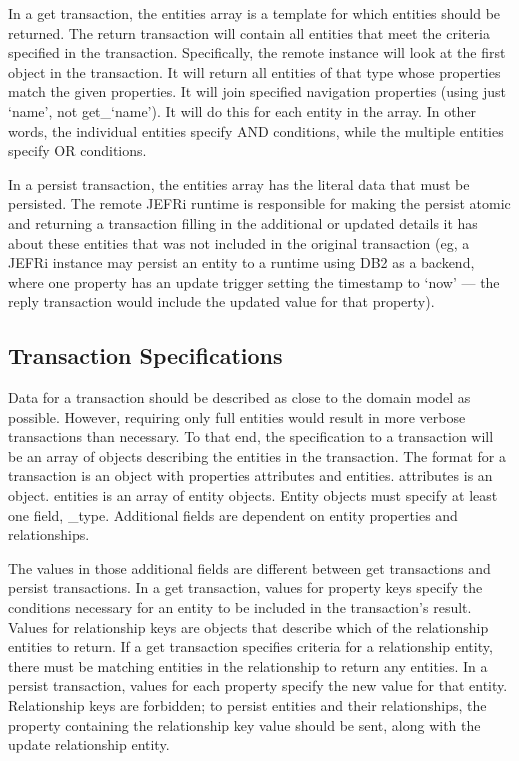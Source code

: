 \documentclass{article}
\renewcommand{\|}{\textbar}
\begin{document}
In a {\ilcode get} transaction, the entities array is a template for which
entities should be returned. The return transaction will contain all entities
that meet the criteria specified in the transaction. Specifically, the remote
instance will look at the first object in the transaction. It will return all
entities of that type whose properties match the given properties. It will join
specified navigation properties (using just {\ilcode `name'}, not {\ilcode
get\_`name'}). It will do this for each entity in the array. In other words, the
individual entities specify AND conditions, while the multiple entities specify
OR conditions.

In a {\ilcode persist} transaction, the entities array has the literal data that
must be persisted. The remote JEFRi runtime is responsible for making the
persist atomic and returning a transaction filling in the additional or updated
details it has about these entities that was not included in the original
transaction (eg, a JEFRi instance may persist an entity to a runtime using DB2
as a backend, where one property has an update trigger setting the timestamp to
`now' --- the reply transaction would include the updated value for that
property).

\subsection{Transaction Specifications}

Data for a transaction should be described as close to the domain model as
possible. However, requiring only full entities would result in more verbose
transactions than necessary. To that end, the specification to a transaction
will be an array of objects describing the entities in the transaction. The
format for a transaction is an object with properties {\ilcode attributes} and
{\ilcode entities}. {\ilcode attributes} is an object. {\ilcode entities} is an
array of entity objects. Entity objects must specify at least one field,
{\ilcode \_type}. Additional fields are dependent on entity properties and
relationships.

The values in those additional fields are different between {\ilcode get}
transactions and {\ilcode persist} transactions. In a {\ilcode get} transaction,
values for property keys specify the conditions necessary for an entity to be
included in the transaction's result. Values for relationship keys are objects
that describe which of the relationship entities to return. If a {\ilcode get}
transaction specifies criteria for a relationship entity, there must be matching
entities in the relationship to return any entities. In a {\ilcode persist}
transaction, values for each property specify the new value for that entity.
Relationship keys are forbidden; to persist entities and their relationships,
the property containing the relationship key value should be sent, along with
the update relationship entity.
\end{document}

